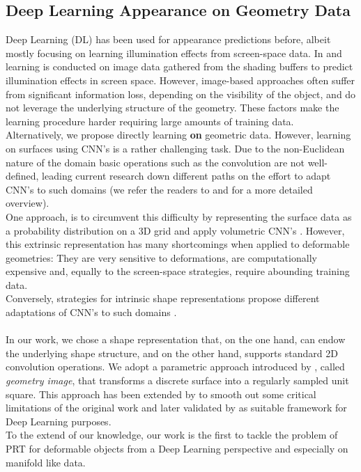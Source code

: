 \subsection*{Deep Learning Appearance on Geometry Data} 
Deep Learning (DL) has been used for appearance predictions before, albeit mostly focusing on learning illumination effects from screen-space data. In  \cite{Nalbach2017b} and \cite{DBLP} learning is conducted on image data gathered from the shading buffers to predict illumination effects in screen space. However, image-based approaches often suffer from significant information loss, depending on the visibility of the object, and do not leverage the underlying structure of the geometry. These factors make the learning procedure harder requiring large amounts of training data.
\\
Alternatively, we propose directly learning \textbf{on} geometric data.  However, learning on surfaces using CNN's is a rather challenging task. Due to the non-Euclidean nature of the domain basic operations such as the convolution are not well-defined, leading current research down different paths on the effort to adapt CNN's to such domains (we refer the readers to \cite{Geometric_deep_learning} and \cite{DeepGeoCourse} for a more detailed overview).
\\
One approach, is to circumvent this difficulty by representing the surface data as a probability distribution on a  3D grid and apply volumetric CNN's \cite{3d_ShapeNets}. However, this extrinsic representation has many shortcomings when applied to deformable geometries: They are very sensitive to deformations, are computationally expensive and, equally to the screen-space strategies, require abounding training data.
\\
Conversely, strategies for intrinsic shape representations propose different adaptations of CNN's to such domains \cite{ShapeNet1, BoscainiMRB16, CNN_on_Torus}.
\\
\\ 
In our work, we chose a shape representation that, on the one hand, can endow the underlying shape structure, and on the other hand, supports standard 2D convolution operations. We adopt a parametric approach introduced by \cite{gu2002geometry}, called \textit{geometry image}, that transforms a discrete surface into a regularly sampled unit square. This approach has been extended by \cite{Spherical_Parametrization} to smooth out some critical limitations of the original work and later validated by \cite{sinha2016deep} as suitable framework for Deep Learning purposes.
\\
To the extend of our knowledge, our work is the first to tackle the problem of PRT for deformable objects from a Deep Learning perspective and especially on manifold like data. 


